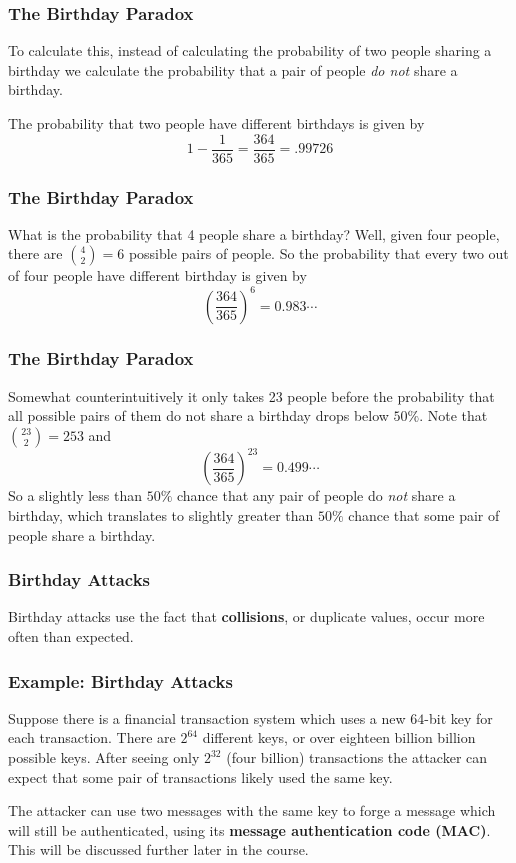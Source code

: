 \documentclass{beamer}
\newcommand{\<}{\langle}
\renewcommand{\>}{\rangle}
\begin{document}
\begin{frame}
\frametitle{The Birthday Paradox}

To calculate this, instead of calculating the probability of two people sharing a birthday we calculate the probability that a pair of people \emph{do not} share a birthday. \newline

The probability that two people have different birthdays is given by
\[
1 - \frac{1}{365} = \frac{364}{365} = .99726
\]
\end{frame}


\begin{frame}
\frametitle{The Birthday Paradox}

What is the probability that 4 people share a birthday? Well, given four people, there are ${4\choose 2 }= 6$ possible pairs of people. So the probability that every two out of four people have different birthday is given by 
\[
\left(\frac{364}{365}\right)^6 = 0.983\cdots
\]
\end{frame}

\begin{frame}
\frametitle{The Birthday Paradox}

Somewhat counterintuitively it only takes 23 people before the probability that all possible pairs of them do not share a birthday drops below $50\%$. Note that ${23 \choose 2} = 253$ and 
\[
\left(\frac{364}{365}\right)^{23} = 0.499\cdots
\]
So a slightly less than $50\%$ chance that any pair of people do \emph{not} share a birthday, which translates to slightly greater than $50\%$ chance that some pair of people share a birthday. 
\end{frame}


\begin{frame}
\frametitle{Birthday Attacks}

Birthday attacks use the fact that \textbf{collisions}, or duplicate values, occur more often than expected. 
\end{frame}

\begin{frame}
\frametitle{Example: Birthday Attacks}

Suppose there is a financial transaction system which uses a new $64$-bit key for each transaction. There are $2^{64}$ different keys, or over eighteen billion billion possible keys. After seeing only $2^{32}$ (four billion) transactions the attacker can expect that some pair of transactions likely used the same key. \newline

The attacker can use two messages with the same key  to forge a message which will still be authenticated, using its \textbf{message authentication code (MAC)}. This will be discussed further later in the course. 
\end{frame}
\end{document}

